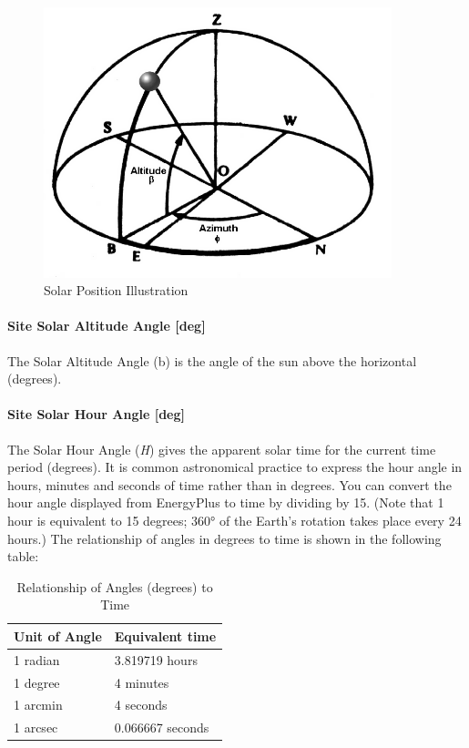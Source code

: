 \begin{figure}[hbtp] %
\centering
\includegraphics[width=0.9\textwidth, height=0.9\textheight, keepaspectratio=true]{media/image020.png}
\caption{Solar Position Illustration \protect \label{fig:solar-position-illustration}}
\end{figure}

\paragraph{Site Solar Altitude Angle {[}deg{]}}\label{site-solar-altitude-angle-deg}

The Solar Altitude Angle (b) is the angle of the sun above the horizontal (degrees).

\paragraph{Site Solar Hour Angle {[}deg{]}}\label{site-solar-hour-angle-deg}

The Solar Hour Angle (\emph{H}) gives the apparent solar time for the current time period (degrees). It is common astronomical practice to express the hour angle in hours, minutes and seconds of time rather than in degrees. You can convert the hour angle displayed from EnergyPlus to time by dividing by 15. (Note that 1 hour is equivalent to 15 degrees; 360° of the Earth's rotation takes place every 24 hours.) The relationship of angles in degrees to time is shown in the following table:

\begin{longtable}[c]{@{}ll@{}}
\caption{Relationship of Angles (degrees) to Time \protect \label{table:relationship-of-angles-degrees-to-time}}\\
\toprule 
Unit of Angle & Equivalent time \tabularnewline \midrule
\endhead
1 radian & 3.819719 hours \tabularnewline
1 degree & 4 minutes \tabularnewline
1 arcmin & 4 seconds \tabularnewline
1 arcsec & 0.066667 seconds \tabularnewline
\bottomrule
\end{longtable}

